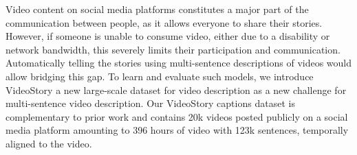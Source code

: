 Video content on social media platforms constitutes a major part of the communication between people, as it allows everyone to share their stories. However, if someone is unable to consume video, either due to a disability or network bandwidth, this severely limits their participation and communication. Automatically telling the stories using multi-sentence descriptions of videos would allow bridging this gap. To learn and evaluate such models,  we introduce VideoStory a new large-scale dataset for video description as a new challenge for multi-sentence video description. Our VideoStory captions dataset is complementary to prior work and contains 20k videos posted publicly on a social media platform amounting to 396 hours of video with 123k sentences, temporally aligned to the video.
